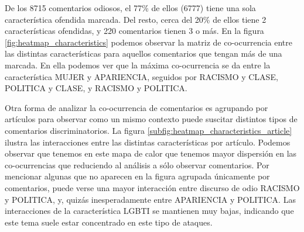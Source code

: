 De los 8715 comentarios odiosos, el 77\% de ellos (6777) tiene una sola característica ofendida marcada. Del resto, cerca del 20\% de ellos tiene 2 características ofendidas, y 220 comentarios tienen 3 o más. En la figura \ref{fig:heatmap_characteristics} podemos observar la matriz de co-ocurrencia entre las distintas características para aquellos comentarios que tengan más de una marcada. En ella podemos ver que la máxima co-ocurrencia se da entre la característica MUJER y APARIENCIA, seguidos por RACISMO y CLASE, POLITICA y CLASE, y RACISMO y POLITICA.



Otra forma de analizar la co-ocurrencia de comentarios es agrupando por artículos para observar como un mismo contexto puede suscitar distintos tipos de comentarios discriminatorios. La figura \ref{subfig:heatmap_characteristics_article} ilustra las interacciones entre las distintas características por artículo. Podemos observar que tenemos en este mapa de calor que tenemos mayor dispersión en las co-ocurrencias que reduciendo al análisis a sólo observar comentarios. Por mencionar algunas que no aparecen en la figura agrupada únicamente por comentarios, puede verse una mayor interacción entre discurso de odio RACISMO y POLITICA, y, quizás inesperadamente entre APARIENCIA y POLITICA. Las interacciones de la característica LGBTI se mantienen muy bajas, indicando que este tema suele estar concentrado en este tipo de ataques.



